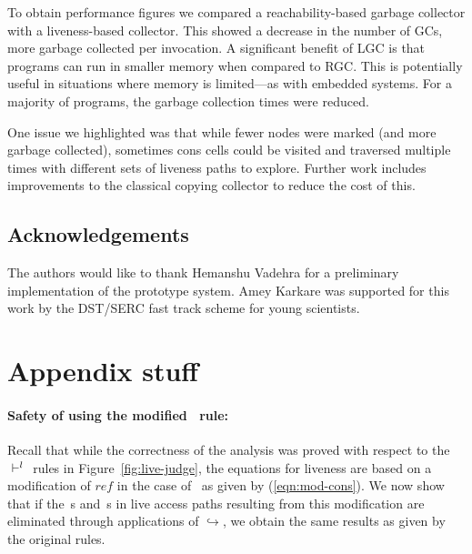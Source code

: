 To obtain performance figures we compared a reachability-based garbage
collector with a liveness-based  collector.  This showed a decrease in
the  number  of  GCs,   more  garbage  collected  per  invocation.   A
significant benefit of LGC is  that programs can run in smaller memory
when compared to  RGC. This is potentially useful  in situations where
memory  is  limited---as with  embedded  systems.  For  a majority  of
programs, the garbage collection times were reduced.

One issue we  highlighted was that while fewer  nodes were marked (and
more garbage collected), sometimes  cons cells could be visited and
traversed  multiple times  with different  sets of  liveness  paths to
explore.  Further work includes  improvements to the classical copying
collector to reduce the cost of this.



\subsection*{Acknowledgements}
The authors  would like  to thank Hemanshu  Vadehra for  a preliminary
implementation of the prototype system. Amey Karkare was supported for
this work by the DST/SERC fast track scheme for young scientists.  

{}







\appendix
\section{Appendix stuff}

\paragraph{Safety of using the modified \CONS\  rule:}
Recall that while the correctness of the analysis was proved with
respect to  the $\ \vdash^l\ $ rules  in Figure~\ref{fig:live-judge}, the
equations   for  liveness   are  based   on  a   modification  of
$\mathit{ref}$    in    the    case    of   \CONS\  as  given    by
(\ref{eqn:mod-cons}).  We now show that  if the \bcar\,s and \bcdr\,s
in live access  paths resulting  from this  modification are
eliminated through  applications of $\hookrightarrow$,  we obtain
the same results as given by the original rules.


